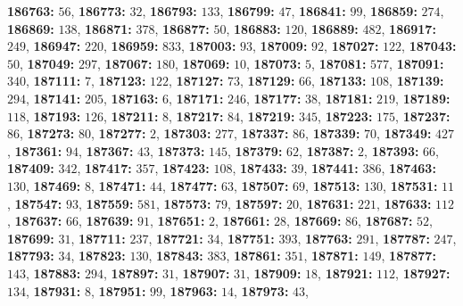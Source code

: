 \textsf{\bfseries 186763:} $56$, \textsf{\bfseries 186773:} $32$, \textsf{\bfseries 186793:} $133$, \textsf{\bfseries 186799:} $47$, \textsf{\bfseries 186841:} $99$, \textsf{\bfseries 186859:} $274$, \textsf{\bfseries 186869:} $138$, \textsf{\bfseries 186871:} $378$, \textsf{\bfseries 186877:} $50$, \textsf{\bfseries 186883:} $120$, \textsf{\bfseries 186889:} $482$, \textsf{\bfseries 186917:} $249$, \textsf{\bfseries 186947:} $220$, \textsf{\bfseries 186959:} $833$, \textsf{\bfseries 187003:} $93$, \textsf{\bfseries 187009:} $92$, \textsf{\bfseries 187027:} $122$, \textsf{\bfseries 187043:} $50$, \textsf{\bfseries 187049:} $297$, \textsf{\bfseries 187067:} $180$, \textsf{\bfseries 187069:} $10$, \textsf{\bfseries 187073:} $5$, \textsf{\bfseries 187081:} $577$, \textsf{\bfseries 187091:} $340$, \textsf{\bfseries 187111:} $7$, \textsf{\bfseries 187123:} $122$, \textsf{\bfseries 187127:} $73$, \textsf{\bfseries 187129:} $66$, \textsf{\bfseries 187133:} $108$, \textsf{\bfseries 187139:} $294$, \textsf{\bfseries 187141:} $205$, \textsf{\bfseries 187163:} $6$, \textsf{\bfseries 187171:} $246$, \textsf{\bfseries 187177:} $38$, \textsf{\bfseries 187181:} $219$, \textsf{\bfseries 187189:} $118$, \textsf{\bfseries 187193:} $126$, \textsf{\bfseries 187211:} $8$, \textsf{\bfseries 187217:} $84$, \textsf{\bfseries 187219:} $345$, \textsf{\bfseries 187223:} $175$, \textsf{\bfseries 187237:} $86$, \textsf{\bfseries 187273:} $80$, \textsf{\bfseries 187277:} $2$, \textsf{\bfseries 187303:} $277$, \textsf{\bfseries 187337:} $86$, \textsf{\bfseries 187339:} $70$, \textsf{\bfseries 187349:} $427$, \textsf{\bfseries 187361:} $94$, \textsf{\bfseries 187367:} $43$, \textsf{\bfseries 187373:} $145$, \textsf{\bfseries 187379:} $62$, \textsf{\bfseries 187387:} $2$, \textsf{\bfseries 187393:} $66$, \textsf{\bfseries 187409:} $342$, \textsf{\bfseries 187417:} $357$, \textsf{\bfseries 187423:} $108$, \textsf{\bfseries 187433:} $39$, \textsf{\bfseries 187441:} $386$, \textsf{\bfseries 187463:} $130$, \textsf{\bfseries 187469:} $8$, \textsf{\bfseries 187471:} $44$, \textsf{\bfseries 187477:} $63$, \textsf{\bfseries 187507:} $69$, \textsf{\bfseries 187513:} $130$, \textsf{\bfseries 187531:} $11$, \textsf{\bfseries 187547:} $93$, \textsf{\bfseries 187559:} $581$, \textsf{\bfseries 187573:} $79$, \textsf{\bfseries 187597:} $20$, \textsf{\bfseries 187631:} $221$, \textsf{\bfseries 187633:} $112$, \textsf{\bfseries 187637:} $66$, \textsf{\bfseries 187639:} $91$, \textsf{\bfseries 187651:} $2$, \textsf{\bfseries 187661:} $28$, \textsf{\bfseries 187669:} $86$, \textsf{\bfseries 187687:} $52$, \textsf{\bfseries 187699:} $31$, \textsf{\bfseries 187711:} $237$, \textsf{\bfseries 187721:} $34$, \textsf{\bfseries 187751:} $393$, \textsf{\bfseries 187763:} $291$, \textsf{\bfseries 187787:} $247$, \textsf{\bfseries 187793:} $34$, \textsf{\bfseries 187823:} $130$, \textsf{\bfseries 187843:} $383$, \textsf{\bfseries 187861:} $351$, \textsf{\bfseries 187871:} $149$, \textsf{\bfseries 187877:} $143$, \textsf{\bfseries 187883:} $294$, \textsf{\bfseries 187897:} $31$, \textsf{\bfseries 187907:} $31$, \textsf{\bfseries 187909:} $18$, \textsf{\bfseries 187921:} $112$, \textsf{\bfseries 187927:} $134$, \textsf{\bfseries 187931:} $8$, \textsf{\bfseries 187951:} $99$, \textsf{\bfseries 187963:} $14$, \textsf{\bfseries 187973:} $43$, 
